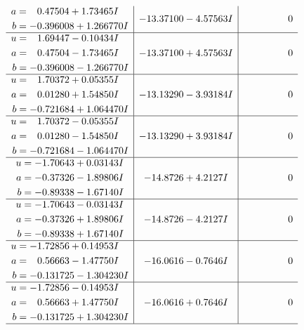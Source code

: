 \documentclass[1p]{elsarticle_modified}
\theoremstyle{definition}
\begin{document}
$$\begin{array}{c|c|c}
\begin{aligned}
a &= \phantom{-}0.47504 + 1.73465 I \\
b &= -0.396008 + 1.266770 I\end{aligned}
 & -13.37100 - 4.57563 I & \phantom{-0.000000 } 0 \\ \hline\begin{aligned}
u &= \phantom{-}1.69447 - 0.10434 I \\
a &= \phantom{-}0.47504 - 1.73465 I \\
b &= -0.396008 - 1.266770 I\end{aligned}
 & -13.37100 + 4.57563 I & \phantom{-0.000000 } 0 \\ \hline\begin{aligned}
u &= \phantom{-}1.70372 + 0.05355 I \\
a &= \phantom{-}0.01280 + 1.54850 I \\
b &= -0.721684 + 1.064470 I\end{aligned}
 & -13.13290 - 3.93184 I & \phantom{-0.000000 } 0 \\ \hline\begin{aligned}
u &= \phantom{-}1.70372 - 0.05355 I \\
a &= \phantom{-}0.01280 - 1.54850 I \\
b &= -0.721684 - 1.064470 I\end{aligned}
 & -13.13290 + 3.93184 I & \phantom{-0.000000 } 0 \\ \hline\begin{aligned}
u &= -1.70643 + 0.03143 I \\
a &= -0.37326 - 1.89806 I \\
b &= -0.89338 - 1.67140 I\end{aligned}
 & -14.8726 + 4.2127 I & \phantom{-0.000000 } 0 \\ \hline\begin{aligned}
u &= -1.70643 - 0.03143 I \\
a &= -0.37326 + 1.89806 I \\
b &= -0.89338 + 1.67140 I\end{aligned}
 & -14.8726 - 4.2127 I & \phantom{-0.000000 } 0 \\ \hline\begin{aligned}
u &= -1.72856 + 0.14953 I \\
a &= \phantom{-}0.56663 - 1.47750 I \\
b &= -0.131725 - 1.304230 I\end{aligned}
 & -16.0616 - 0.7646 I & \phantom{-0.000000 } 0 \\ \hline\begin{aligned}
u &= -1.72856 - 0.14953 I \\
a &= \phantom{-}0.56663 + 1.47750 I \\
b &= -0.131725 + 1.304230 I\end{aligned}
 & -16.0616 + 0.7646 I & \phantom{-0.000000 } 0\\
 \hline 
 \end{array}$$\newpage\newpage\renewcommand{\arraystretch}{1}
\end{document}
